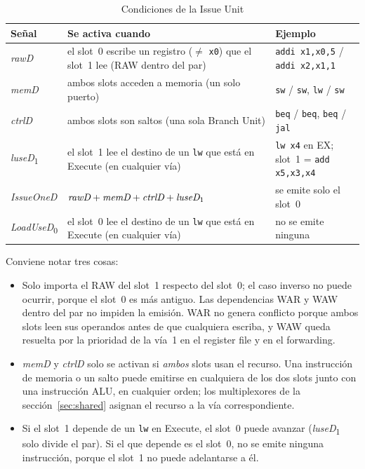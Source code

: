 \documentclass[11pt,a4paper]{article}
\newcommand{\sig}[1]{\textit{#1}}
\newcommand{\sigk}[2]{\textit{#1}\textsubscript{#2}}
\newcommand{\ins}[1]{\texttt{#1}}
\begin{document}
\begin{table}[htbp]
\centering\small
\caption{Condiciones de la Issue Unit}
\label{tab:issue}
\begin{tabular}{@{}l>{\raggedright\arraybackslash}p{6.4cm}>{\raggedright\arraybackslash}p{4.6cm}@{}}
\toprule
Señal & Se activa cuando & Ejemplo \\
\midrule
\sig{rawD} & el slot~0 escribe un registro ($\neq$ \ins{x0}) que el slot~1 lee (RAW dentro del par) &
  \ins{addi x1,x0,5} / \ins{addi x2,x1,1} \\[1pt]
\sig{memD} & ambos slots acceden a memoria (un solo puerto) & \ins{sw} / \ins{sw}, \ins{lw} / \ins{sw} \\
\sig{ctrlD} & ambos slots son saltos (una sola Branch Unit) & \ins{beq} / \ins{beq}, \ins{beq} / \ins{jal} \\
\sigk{luseD}{1} & el slot~1 lee el destino de un \ins{lw} que está en Execute (en cualquier vía) & \ins{lw x4} en EX; slot~1 = \ins{add x5,x3,x4} \\
\midrule
\sig{IssueOneD} & $\sig{rawD} + \sig{memD} + \sig{ctrlD} + \sigk{luseD}{1}$ & se emite solo el slot~0 \\
\sigk{LoadUseD}{0} & el slot~0 lee el destino de un \ins{lw} que está en Execute (en cualquier vía) & no se emite ninguna \\
\bottomrule
\end{tabular}
\end{table}

Conviene notar tres cosas:
\begin{itemize}
  \item Solo importa el RAW del slot~1 respecto del slot~0; el caso inverso no puede
        ocurrir, porque el slot~0 es más antiguo. Las dependencias WAR y WAW dentro del
        par no impiden la emisión. WAR no genera conflicto porque ambos slots leen sus
        operandos antes de que cualquiera escriba, y WAW queda resuelta por la prioridad de
        la vía~1 en el register file y en el forwarding.
  \item \sig{memD} y \sig{ctrlD} solo se activan si \emph{ambos} slots usan el recurso.
        Una instrucción de memoria o un salto puede emitirse en cualquiera de los dos slots
        junto con una instrucción ALU, en cualquier orden; los multiplexores de la
        sección~\ref{sec:shared} asignan el recurso a la vía correspondiente.
  \item Si el slot~1 depende de un \ins{lw} en Execute, el slot~0 puede avanzar
        (\sigk{luseD}{1} solo divide el par). Si el que depende es el slot~0, no se emite
        ninguna instrucción, porque el slot~1 no puede adelantarse a él.
\end{itemize}
\end{document}
